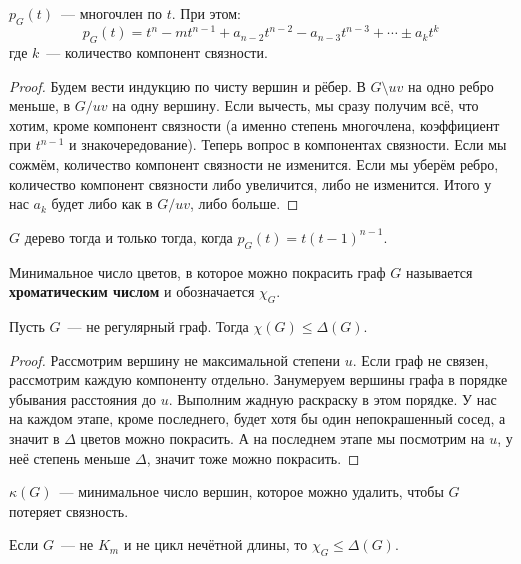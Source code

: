 \documentclass{article}
\begin{document}
    \begin{theorem}
        $p_G(t)$~--- многочлен по $t$. При этом:
        $$
        p_G(t)=t^n-mt^{n-1}+a_{n-2}t^{n-2}-a_{n-3}t^{n-3}+\cdots\pm a_kt^k
        $$
        где $k$~--- количество компонент связности.
    \end{theorem}
    \begin{proof}
        Будем вести индукцию по чисту вершин и рёбер. В $G\setminus uv$ на одно ребро меньше, в $G/uv$ на одну вершину. Если вычесть, мы сразу получим всё, что хотим, кроме компонент связности (а именно степень многочлена, коэффициент при $t^{n-1}$ и знакочередование). Теперь вопрос в компонентах связности. Если мы сожмём, количество компонент связности не изменится. Если мы уберём ребро, количество компонент связности либо увеличится, либо не изменится. Итого у нас $a_k$ будет либо как в $G/uv$, либо больше.
    \end{proof}
    \begin{corollary}
        $G$ дерево тогда и только тогда, когда $p_G(t)=t(t-1)^{n-1}$.
    \end{corollary}
    \begin{definition}
        Минимальное число цветов, в которое можно покрасить граф $G$ называется \textbf{хроматическим числом} и обозначается $\chi_G$.
    \end{definition}
    \begin{lemma}
        Пусть $G$~--- не регулярный граф. Тогда $\chi(G)\leqslant\Delta(G)$.
    \end{lemma}
    \begin{proof}
        Рассмотрим вершину не максимальной степени $u$. Если граф не связен, рассмотрим каждую компоненту отдельно. Занумеруем вершины графа в порядке убывания расстояния до $u$. Выполним жадную раскраску в этом порядке. У нас на каждом этапе, кроме последнего, будет хотя бы один непокрашенный сосед, а значит в $\Delta$ цветов можно покрасить. А на последнем этапе мы посмотрим на $u$, у неё степень меньше $\Delta$, значит тоже можно покрасить.
    \end{proof}
    \begin{definition}
        $\kappa(G)$~--- минимальное число вершин, которое можно удалить, чтобы $G$ потеряет связность.
    \end{definition}
    \begin{theorem}
        Если $G$~--- не $K_m$ и не цикл нечётной длины, то $\chi_G\leqslant\Delta(G)$.
    \end{theorem}
\end{document}
